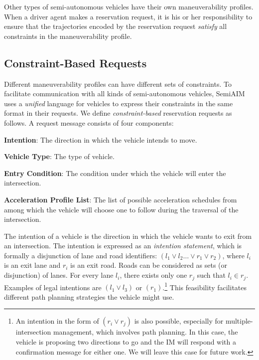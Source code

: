 Other types of semi-autonomous vehicles have their own maneuverability
profiles.  When a driver agent makes a reservation request, it is
his or her responsibility to ensure that the trajectories encoded by the
reservation request \emph{satisfy} all constraints in the
maneuverability profile.

\subsection{Constraint-Based Requests}

Different maneuverability profiles can have different sets of
constraints.  To facilitate communication with all kinds of
semi-autonomous vehicles, SemiAIM uses a \emph{unified}
language for vehicles to express their constraints in the same format
in their requests.  We define \emph{constraint-based} reservation
requests as follows.  A request message consists of four components:
\begin{compactenum}
\item{\bf Intention}: The direction in which the vehicle intends to
  move.
\item{\bf Vehicle Type}: The type of vehicle.
\item{\bf Entry Condition}: The condition under which the vehicle
  will enter the intersection.
\item{\bf Acceleration Profile List}: The list of possible acceleration schedules
  from among which the vehicle will choose one to follow
  during the traversal of the intersection.
\end{compactenum}
The intention of a vehicle is the direction in which the vehicle wants
to exit from an intersection.  The intention is expressed as an
\emph{intention statement}, which is formally a disjunction of lane
and road identifiers: $(l_1 \vee l_2 \ldots \vee r_1 \vee r_2)$, where
$l_i$ is an exit lane and $r_i$ is an exit road. Roads can be
considered as sets (or disjunction) of lanes. For every lane $l_i$,
there exists only one $r_j$ such that $l_i \in r_j$. 
Examples of legal intentions are $(l_1 \vee l_3)$ or
$(r_1)$.\footnote{An intention in the form of $(r_i \vee r_j)$ is also possible,
especially for multiple-intersection management, which involves path
planning. In this case, the vehicle is proposing two directions to go
and the IM will respond with a confirmation message for either one. We
will leave this case for future work.}
This feasibility facilitates different path planning strategies the
vehicle might use.

